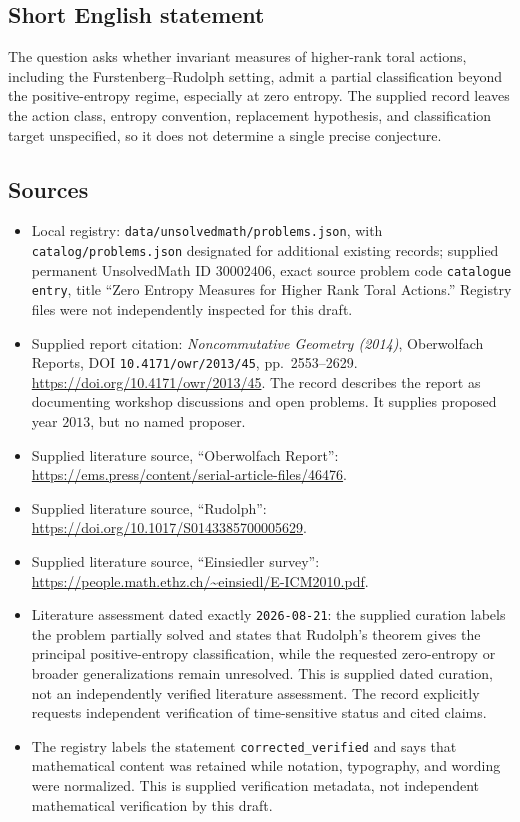 \documentclass[11pt]{article}
\begin{document}
\subsection{Short English statement}
The question asks whether invariant measures of higher-rank toral actions, including the Furstenberg--Rudolph setting, admit a partial classification beyond the positive-entropy regime, especially at zero entropy. The supplied record leaves the action class, entropy convention, replacement hypothesis, and classification target unspecified, so it does not determine a single precise conjecture.
\subsection{Sources}
\begin{itemize}
\item Local registry: \texttt{data/unsolvedmath/problems.json}, with \texttt{catalog/problems.json} designated for additional existing records; supplied permanent UnsolvedMath ID \(30002406\), exact source problem code \texttt{catalogue entry}, title ``Zero Entropy Measures for Higher Rank Toral Actions.'' Registry files were not independently inspected for this draft.
\item Supplied report citation: \emph{Noncommutative Geometry (2014)}, Oberwolfach Reports, DOI \texttt{10.4171/owr/2013/45}, pp.\ 2553--2629. \url{https://doi.org/10.4171/owr/2013/45}. The record describes the report as documenting workshop discussions and open problems. It supplies proposed year \(2013\), but no named proposer.
\item Supplied literature source, ``Oberwolfach Report'': \url{https://ems.press/content/serial-article-files/46476}.
\item Supplied literature source, ``Rudolph'': \url{https://doi.org/10.1017/S0143385700005629}.
\item Supplied literature source, ``Einsiedler survey'': \url{https://people.math.ethz.ch/~einsiedl/E-ICM2010.pdf}.
\item Literature assessment dated exactly \texttt{2026-08-21}: the supplied curation labels the problem partially solved and states that Rudolph's theorem gives the principal positive-entropy classification, while the requested zero-entropy or broader generalizations remain unresolved. This is supplied dated curation, not an independently verified literature assessment. The record explicitly requests independent verification of time-sensitive status and cited claims.
\item The registry labels the statement \texttt{corrected\_verified} and says that mathematical content was retained while notation, typography, and wording were normalized. This is supplied verification metadata, not independent mathematical verification by this draft.
\end{itemize}
\end{document}
